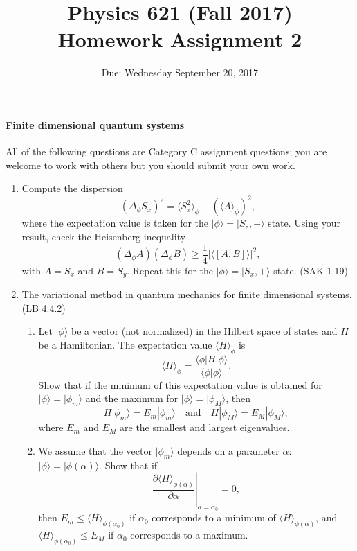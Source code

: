 \documentclass[letterpaper,11pt]{article}
\title{Physics 621 (Fall 2017) \\ Homework Assignment 2}
\date{Due: Wednesday September 20, 2017}
\begin{document}
\maketitle

\paragraph*{Finite dimensional quantum systems}

All of the following questions are Category C assignment questions; you are welcome to work with others but you should submit your own work.

\begin{enumerate}
  \item Compute the dispersion
  $$ \left( \Delta_\phi S_x \right)^2 = \langle S_x^2 \rangle_\phi - \left(\langle A \rangle_\phi\right)^2, $$
  where the expectation value is taken for the $|\phi\rangle = |S_z,+\rangle$ state. Using your result, check the Heisenberg inequality
  $$ \left( \Delta_\phi A \right) \left( \Delta_\phi B \right) \ge \frac{1}{4} \left| \langle \left[ A,B \right] \rangle \right|^2, $$
  with $A = S_x$ and $B = S_y$. Repeat this for the $|\phi\rangle = |S_x,+\rangle$ state. (SAK 1.19)
  \item The variational method in quantum mechanics for finite dimensional systems. (LB 4.4.2)
  \begin{enumerate}
    \item Let $|\phi\rangle$ be a vector (not normalized) in the Hilbert space of states and $H$ be a Hamiltonian. The expectation value $\langle H \rangle_{\phi}$ is
    $$ \langle H \rangle_{\phi} = \frac{\langle \phi|H|\phi \rangle}{\langle \phi|\phi \rangle}. $$
    Show that if the minimum of this expectation value is obtained for $|\phi\rangle = |\phi_m\rangle$ and the maximum for $|\phi\rangle = |\phi_M\rangle$, then
    $$ H |\phi_m\rangle = E_m |\phi_m\rangle \quad \mbox{and} \quad H |\phi_M\rangle = E_M |\phi_M\rangle, $$
    where $E_m$ and $E_M$ are the smallest and largest eigenvalues.
    \item We assume that the vector $|\phi_m\rangle$ depends on a parameter $\alpha$: $|\phi\rangle = |\phi(\alpha)\rangle$. Show that if
    $$ \left. \frac{\partial \langle H \rangle_{\phi(\alpha)}}{\partial \alpha} \right|_{\alpha = \alpha_0} = 0, $$
    then $E_m \le \langle H \rangle_{\phi(\alpha_0)}$ if $\alpha_0$ corresponds to a minimum of $\langle H \rangle_{\phi(\alpha)}$, and $\langle H \rangle_{\phi(\alpha_0)} \le E_M$ if $\alpha_0$ corresponds to a maximum.

\end{enumerate}
\end{enumerate}
\end{document}
